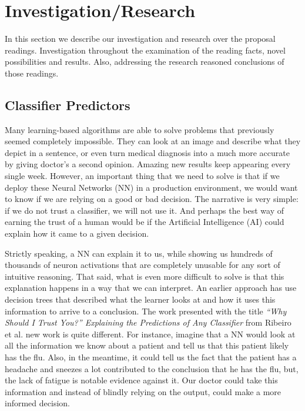 \section{Investigation/Research}

In this section we describe our investigation and research over the proposal readings. Investigation throughout the examination of the reading facts, novel possibilities and results. Also, addressing the research reasoned conclusions of those readings.

\subsection{Classifier Predictors}

Many learning-based algorithms are able to solve problems that previously seemed completely impossible. They can look at an image and describe what they depict in a sentence, or even turn medical diagnosis into a much more accurate by giving doctor's a second opinion. Amazing new results keep appearing every single week. However, an important thing that we need to solve is that if we deploy these Neural Networks (NN) in a production environment, we would want to know if we are relying on a good or bad decision. The narrative is very simple: if we do not trust a classifier, we will not use it. And perhaps the best way of earning the trust of a human would be if the Artificial Intelligence (AI) could explain how it came to a given decision.

Strictly speaking, a NN can explain it to us, while showing us hundreds of thousands of neuron activations that are completely unusable for any sort of intuitive reasoning. That said, what is even more difficult to solve is that this explanation happens in a way that we can interpret. An earlier approach has use decision trees that described what the learner looks at and how it uses this information to arrive to a conclusion. The work presented with the title \textit{“Why Should I Trust You?” Explaining the Predictions of Any Classifier} from Ribeiro et al. \cite{ribeiro2016should} new work is quite different. For instance, imagine that a NN would look at all the information we know about a patient and tell us that this patient likely has the flu. Also, in the meantime, it could tell us the fact that the patient has a headache and sneezes a lot contributed to the conclusion that he has the flu, but, the lack of fatigue is notable evidence against it. Our doctor could take this information and instead of blindly relying on the output, could make a more informed decision.

